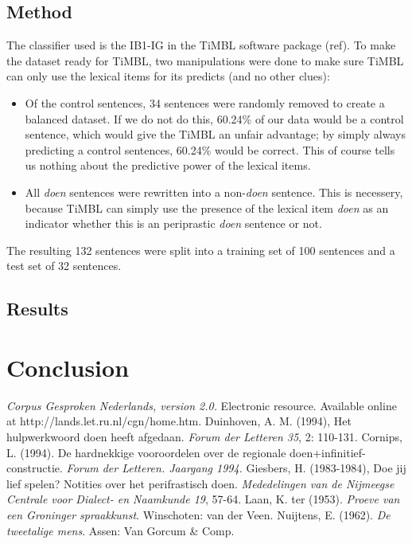 \documentclass[12pt]{article}
\begin{document}
\subsection{Method}

The classifier used is the IB1-IG in the TiMBL software package (ref). To make the dataset ready for TiMBL, two manipulations were done to make sure TiMBL can only use the lexical items for its predicts (and no other clues):


\begin{itemize}

\item Of the control sentences, 34 sentences were randomly removed to create a balanced dataset. If we do not do this, 60.24\% of our data would be a control sentence, which would give the TiMBL an unfair advantage; by simply always predicting a control sentences, 60.24\% would be correct. This of course tells us nothing about the predictive power of the lexical items.
\item All \emph{doen} sentences were rewritten into a non-\emph{doen} sentence. This is necessery, because TiMBL can simply use the presence of the lexical item \emph{doen} as an indicator whether this is an periprastic \emph{doen} sentence or not.

\end{itemize}

The resulting 132 sentences were split into a training set of 100 sentences and a test set of 32 sentences.

\subsection{Results}











\section{Conclusion} \label{conc}

\begin{thebibliography}{99}
\emph{Corpus Gesproken Nederlands, version 2.0.} Electronic resource. Available online at http://lands.let.ru.nl/cgn/home.htm.
Duinhoven, A. M. (1994), Het hulpwerkwoord doen heeft afgedaan. \emph{Forum der Letteren 35}, 2: 110-131.
Cornips, L. (1994). De hardnekkige vooroordelen over de regionale doen+infinitief-constructie. \emph{Forum der Letteren. Jaargang 1994.}
Giesbers, H. (1983-1984), Doe jij lief spelen? Notities over het perifrastisch doen. \emph{Mededelingen van de Nijmeegse Centrale voor Dialect- en Naamkunde 19}, 57-64.
Laan, K. ter (1953). \emph{Proeve van een Groninger spraakkunst}. Winschoten: van der Veen.
Nuijtens, E. (1962). \emph{De tweetalige mens}. Assen: Van Gorcum \& Comp.
\end{thebibliography}
\end{document}
